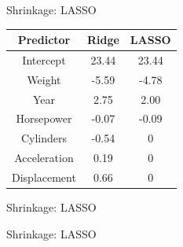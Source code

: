 \documentclass[8pt]{beamer}
\begin{document}
    \begin{frame}{Shrinkage: LASSO}
        \centering
        \vfill
        \begin{tabular}{|c|c|c|}
            \hline
            \textbf{Predictor}&\textbf{Ridge}&\textbf{LASSO}\\
            \hline
            Intercept&23.44&23.44\\
            \hline
            Weight&-5.59&-4.78\\
            \hline
            Year&2.75&2.00\\
            \hline
            Horsepower&-0.07&-0.09\\
            \hline
            Cylinders&-0.54&0\\
            \hline
            Acceleration&0.19&0\\
            \hline
            Displacement&0.66&0\\
            \hline
        \end{tabular}
        \vfill
    \end{frame}

    \begin{frame}{Shrinkage: LASSO}
        \vfill
        \centering
        \vfill
    \end{frame}

    \begin{frame}{Shrinkage: LASSO}
        \vfill
        \centering
        \vfill
    \end{frame}
\end{document}
